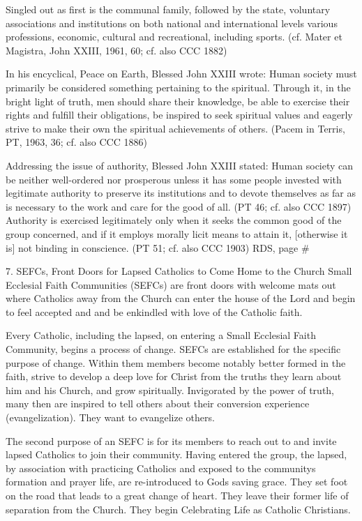 \documentclass[oneside]{book}
\begin{document}
Singled out as first is the communal family, followed by the state, voluntary
associations and institutions on both national and international levels various
professions, economic, cultural and recreational, including sports.  (cf. Mater
et Magistra, John XXIII, 1961, 60; cf. also CCC 1882)

In his encyclical, Peace on Earth, Blessed John XXIII wrote: Human society must
primarily be considered something pertaining to the spiritual. Through it, in
the bright light of truth, men should share their knowledge, be able to exercise
their rights and fulfill their obligations, be inspired to seek spiritual values
and eagerly strive to make their own the spiritual achievements of others.
(Pacem in Terris, PT, 1963, 36; cf. also CCC 1886)

Addressing the issue of authority, Blessed John XXIII stated: Human society can
be neither well-ordered nor prosperous unless it has some people invested with
legitimate authority to preserve its institutions and to devote themselves as
far as is necessary to the work and care for the good of all. (PT 46; cf. also
CCC 1897) Authority is exercised legitimately only when it seeks the common good
of the group concerned, and if it employs morally licit means to attain it,
[otherwise it is] not binding in conscience. (PT 51; cf. also CCC 1903) RDS,
page \#

7. SEFCs, Front Doors for Lapsed Catholics to Come Home to the Church Small
Ecclesial Faith Communities (SEFCs) are front doors with welcome mats out where
Catholics away from the Church can enter the house of the Lord and begin to feel
accepted and and be enkindled with love of the Catholic faith.

Every Catholic, including the lapsed, on entering a Small Ecclesial Faith
Community, begins a process of change. SEFCs are established for the specific
purpose of change. Within them members become notably better formed in the
faith, strive to develop a deep love for Christ from the truths they learn about
him and his Church, and grow spiritually. Invigorated by the power of truth,
many then are inspired to tell others about their conversion experience
(evangelization). They want to evangelize others.

The second purpose of an SEFC is for its members to reach out to and invite
lapsed Catholics to join their community. Having entered the group, the lapsed,
by association with practicing Catholics and exposed to the communitys formation
and prayer life, are re-introduced to Gods saving grace. They set foot on the
road that leads to a great change of heart. They leave their former life of
separation from the Church. They begin Celebrating Life as Catholic Christians.
\end{document}
